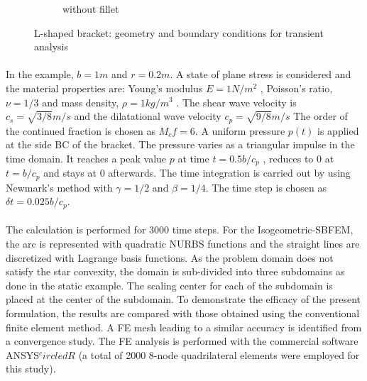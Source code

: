 \begin{figure}
\begin{subfigure}[b]{1\linewidth}
{            }
            \caption{without fillet}
        \end{subfigure}
        \caption{L-shaped bracket: geometry and boundary conditions for transient analysis}
        \label{fig:l_dynamic_geo_bc}
    \end{figure}

\paragraph{}
In the example, $b=1m$ and $r=0.2m$.
A state of plane stress is considered and the material properties are:
    Young’s modulus $E = 1 N/m^2$ , Poisson’s ratio, $\nu = 1/3$ and mass density, $\rho = 1 kg/m^3$ .
    The shear wave velocity is $c_s=\sqrt{3/8}m/s$ and the dilatational wave velocity $c_p=\sqrt{9/8}m/s$
The order of the continued fraction is chosen as $M_cf = 6$.
A uniform pressure $p(t)$ is applied at the side BC of the bracket.
The pressure varies as a triangular impulse in the time domain.
It reaches a peak value $p$ at time $t= 0.5b/c_p$ , reduces to $0$ at $t = b/c_p$ and stays at $0$ afterwards.
The time integration is carried out by using Newmark's method with $\gamma = 1/2$ and $\beta = 1/4$.
The time step is chosen as $\delta t = 0.025b/c_p$.

\paragraph{}
The calculation is performed for 3000 time steps.
For the Isogeometric-SBFEM, the arc is represented with quadratic NURBS functions and the straight lines are discretized with
    Lagrange basis functions.
As the problem domain does not satisfy the star convexity, the domain is sub-divided into three subdomains as done in the static
    example.
The scaling center for each of the subdomain is placed at the center of the subdomain.
To demonstrate the efficacy of the present formulation, the results are compared with those obtained using the conventional
    finite element method.
A FE mesh leading to a similar accuracy is identified from a convergence study.
The FE analysis is performed with the commercial software ANSYS$^circledR$ (a total of 2000 8-node quadrilateral elements
    were employed for this study).

